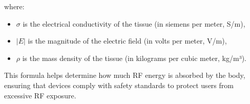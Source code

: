 where:
\begin{itemize}
    \item \(\sigma\) is the electrical conductivity of the tissue (in siemens per meter, S/m),
    \item \(|E|\) is the magnitude of the electric field (in volts per meter, V/m),
    \item \(\rho\) is the mass density of the tissue (in kilograms per cubic meter, kg/m³).
\end{itemize}

This formula helps determine how much RF energy is absorbed by the body, ensuring that devices comply with safety standards to protect users from excessive RF exposure.

